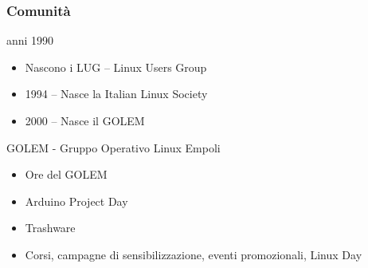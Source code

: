 \documentclass{beamer}
\begin{document}
\begin{frame}
    \frametitle{Comunità}

    \begin{block}{anni 1990}
    \begin{itemize}
        \item Nascono i LUG -- Linux Users Group
        \item 1994 -- Nasce la Italian Linux Society
        \item 2000 -- Nasce il GOLEM
    \end{itemize}
    \end{block}
    \pause

    \begin{block}{GOLEM - Gruppo Operativo Linux Empoli}
        \begin{minipage}{.2\linewidth}
        \end{minipage}
        \begin{minipage}{.75\linewidth}
            \begin{itemize}[<+->]
                \item Ore del GOLEM
                \item Arduino Project Day
                \item Trashware
                \item Corsi, campagne di sensibilizzazione, eventi promozionali, Linux Day
            \end{itemize}
        \end{minipage}
    \end{block}
\end{frame}
\end{document}
